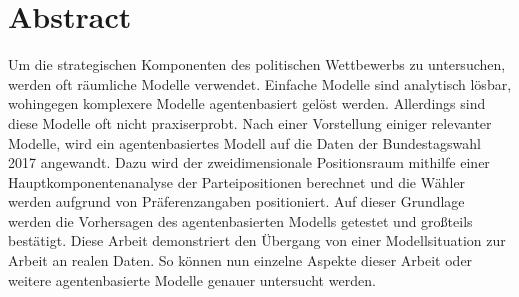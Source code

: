 \documentclass[oneside,12pt,a4paper]{report}
\begin{document}
\section*{Abstract}


Um die strategischen Komponenten des politischen Wettbewerbs zu untersuchen, werden oft räumliche Modelle verwendet.
Einfache Modelle sind analytisch lösbar, wohingegen komplexere Modelle agentenbasiert gelöst werden.
Allerdings sind diese Modelle oft nicht praxiserprobt.
Nach einer Vorstellung einiger relevanter Modelle, wird ein agentenbasiertes Modell auf die Daten der Bundestagswahl 2017 angewandt.
Dazu wird der zweidimensionale Positionsraum mithilfe einer Hauptkomponentenanalyse der Parteipositionen berechnet und die Wähler werden aufgrund von Präferenzangaben positioniert.
Auf dieser Grundlage werden die Vorhersagen des agentenbasierten Modells getestet und großteils bestätigt.
Diese Arbeit demonstriert den Übergang von einer Modellsituation zur Arbeit an realen Daten. So können nun einzelne Aspekte dieser Arbeit oder weitere agentenbasierte Modelle genauer untersucht werden.
\end{document}
